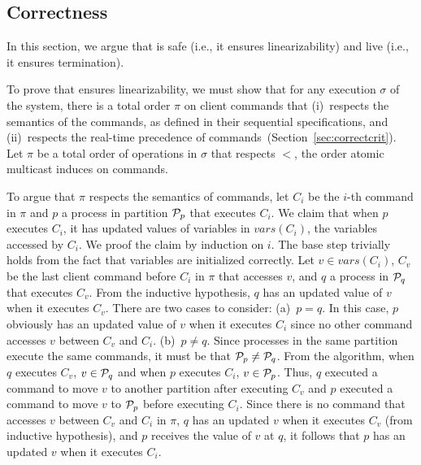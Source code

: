 \clearpage
\subsection{Correctness}
\label{sec:correctness}

In this section, we argue that \dynastar is safe (i.e., it ensures linearizability) and live (i.e., it ensures termination).

To prove that \dynastar ensures linearizability, we must show that for any execution $\sigma$ of the system, there is a total order $\pi$ on client commands that 
(i)~respects the semantics of the commands, as defined in their sequential specifications, and 
(ii)~respects the real-time precedence of commands~(Section~\ref{sec:correctcrit}).
%
Let $\pi$ be a total order of operations in $\sigma$ that respects $<$, the order atomic multicast induces on commands.

To argue that $\pi$ respects the semantics of  commands, let $C_i$ be the $i$-th command in $\pi$ and $p$ a process in partition $\mathcal{P}_p$ that executes $C_i$.
We claim that when $p$ executes $C_i$, it has updated values of variables in $vars(C_i)$, the variables accessed by $C_i$.
We proof the claim by induction on $i$.
The base step trivially holds from the fact that variables are initialized correctly.
Let $v \in vars(C_i)$, $C_v$ be the last client command before $C_i$ in $\pi$ that accesses $v$, and $q$ a process in $\mathcal{P}_q$ that executes $C_v$.
From the inductive hypothesis, $q$ has an updated value of $v$ when it executes $C_v$.
There are two cases to consider:
(a)~$p = q$. In this case, $p$ obviously has an updated value of $v$ when it executes $C_i$ since no other command accesses $v$ between $C_v$ and $C_i$.
(b)~$p \neq q$. 
Since processes in the same partition execute the same commands, it must be that $\mathcal{P}_p \neq \mathcal{P}_q$.
From the algorithm, when $q$ executes $C_v$, $v \in \mathcal{P}_q$ and when $p$ executes $C_i$, $v \in \mathcal{P}_p$.
Thus, $q$ executed a command to move $v$ to another partition after executing $C_v$ and $p$ executed a command to move $v$ to $\mathcal{P}_p$ before executing $C_i$.
Since there is no command that accesses $v$ between $C_v$ and $C_i$ in $\pi$, $q$ has an updated $v$ when it executes $C_v$ (from inductive hypothesis), and $p$ receives the value of $v$ at $q$, it follows that $p$ has an updated $v$ when it executes $C_i$.

